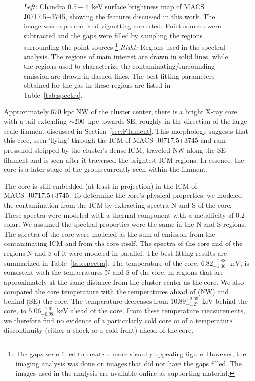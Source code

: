 \begin{figure}
    \caption{\emph{Left:} Chandra $0.5-4$~keV surface brightness map of MACS J0717.5+3745, showing the features discussed in this work. The image was exposure- and vignetting-corrected. Point sources were subtracted and the gaps were filled by sampling the regions surrounding the point sources.\footnote{The gaps were filled to create a more visually appealing figure. However, the imaging analysis was done on images that did not have the gaps filled. The images used in the analysis are available online as supporting material.} \emph{Right:} Regions used in the spectral analysis. The regions of main interest are drawn in solid lines, while the regions used to characterize the contaminating/surrounding emission are drawn in dashed lines. The best-fitting parameters obtained for the gas in these regions are listed in Table~\ref{tab:spectra}. \label{fig:fil}}
\end{figure}

Approximately 670 kpc NW of the cluster center, there is a bright X-ray core with a tail extending $\sim 200$~kpc towards SE, roughly in the direction of the large-scale filament discussed in Section~\ref{sec:Filament}. This morphology suggests that this core, seen `flying' through the ICM of MACS~J0717.5+3745 and ram-pressured stripped by the cluster's dense ICM, traveled NW along the SE filament and is seen after it traversed the brightest ICM regions. In essence, the core is a later stage of the group currently seen within the filament. 

The core is still embedded (at least in projection) in the ICM of MACS~J0717.5+3745. To determine the core's physical properties, we  modeled the contamination from the ICM by extracting spectra N and S of the core. These spectra were modeled with a thermal component with a metallicity of 0.2 solar. We assumed the spectral properties were the same in the N and S regions. The spectra of the core were modeled as the sum of emission from the contaminating ICM and from the core itself. The spectra of the core and of the regions N and S of it were modeled in parallel. The best-fitting results are summarized in Table~\ref{tab:spectra}. The temperature of the core, $6.82_{-1.36}^{+1.88}$~keV, is consistent with the temperatures N and S of the core, in regions that are approximately at the same distance from the cluster center as the core. We also compared the core temperature with the temperatures ahead of (NW) and behind (SE) the core. The temperature decreases from $10.89_{-1.27}^{+2.05}$~keV behind the core, to $5.06_{-0.98}^{+1.61}$~keV ahead of the core. From these temperature measurements, we therefore find no evidence of a particularly cold core or of a temperature discontinuity (either a shock or a cold front) ahead of the core. 

